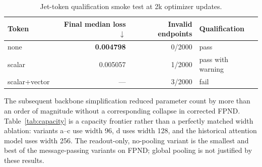 \documentclass[10pt]{article}
\begin{document}
\begin{table}[H]
\centering
\caption{Jet-token qualification smoke test at 2k optimizer updates.}
\label{tab:token-ablation}
\small
\begin{tabular}{lrrl}
\toprule
Token & Final median loss $\downarrow$ & Invalid endpoints & Qualification \\
\midrule
none          & \textbf{0.004798} & 0/2000 & pass \\
scalar        & 0.005057 & 1/2000 & pass with warning \\
scalar+vector & ---      & 3/2000 & fail \\
\bottomrule
\end{tabular}
\end{table}

The subsequent backbone simplification reduced parameter count by more than an order of
magnitude without a corresponding collapse in corrected FPND. Table~\ref{tab:capacity}
is a capacity frontier rather than a perfectly matched width ablation: variants a--c use
width 96, d uses width 128, and the historical attention model uses width 256. The
readout-only, no-pooling variant is the smallest and best of the message-passing variants
on FPND; global pooling is not justified by these results.

\begin{table}[H]
\centering
\caption{Gluon-30 capacity and message-passing simplification at 600k updates. The
attention-model FPND was recomputed after the coordinate repair; its other historical
metrics are omitted here.}
\label{tab:capacity}
\end{table}
\end{document}
